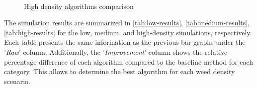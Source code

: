 \begin{figure}[htb]
    \myfloatalign
     \quad
     \\
    \caption{High density algorithms comparison}\label{fig:results-high-density}
\end{figure}

The simulation results are summarized in \autoref{tab:low-results}, \autoref{tab:medium-results}, \autoref{tab:high-results} for the low, medium, and high-density simulations, respectively. Each table presents the same information as the previous bar graphs under the '\textit{Raw}' column. Additionally, the '\textit{Improvement}' column shows the relative percentage difference of each algorithm compared to the baseline method for each category. This allows to determine the best algorithm for each weed density scenario.

